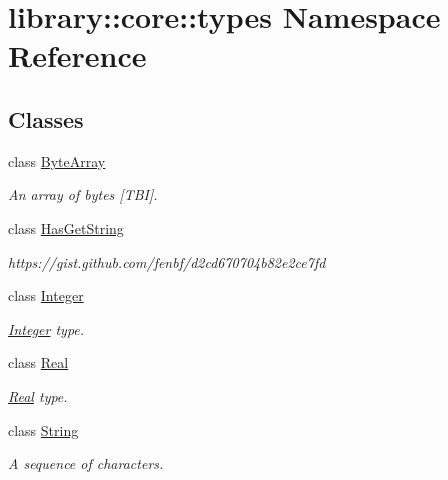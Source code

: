 \hypertarget{namespacelibrary_1_1core_1_1types}{}\section{library\+:\+:core\+:\+:types Namespace Reference}
\label{namespacelibrary_1_1core_1_1types}
\subsection*{Classes}
\begin{DoxyCompactItemize}
\item 
class \hyperlink{classlibrary_1_1core_1_1types_1_1_byte_array}{Byte\+Array}
\begin{DoxyCompactList}\small\item\em An array of bytes \mbox{[}T\+BI\mbox{]}. \end{DoxyCompactList}\item 
class \hyperlink{classlibrary_1_1core_1_1types_1_1_has_get_string}{Has\+Get\+String}
\begin{DoxyCompactList}\small\item\em https\+://gist.github.\+com/fenbf/d2cd670704b82e2ce7fd \end{DoxyCompactList}\item 
class \hyperlink{classlibrary_1_1core_1_1types_1_1_integer}{Integer}
\begin{DoxyCompactList}\small\item\em \hyperlink{classlibrary_1_1core_1_1types_1_1_integer}{Integer} type. \end{DoxyCompactList}\item 
class \hyperlink{classlibrary_1_1core_1_1types_1_1_real}{Real}
\begin{DoxyCompactList}\small\item\em \hyperlink{classlibrary_1_1core_1_1types_1_1_real}{Real} type. \end{DoxyCompactList}\item 
class \hyperlink{classlibrary_1_1core_1_1types_1_1_string}{String}
\begin{DoxyCompactList}\small\item\em A sequence of characters. \end{DoxyCompactList}\end{DoxyCompactItemize}
